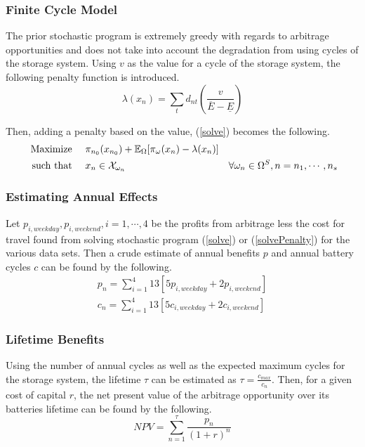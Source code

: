 

\subsubsection{Finite Cycle Model}
The prior stochastic program is extremely greedy with regards to arbitrage opportunities and does not take into account the degradation from using cycles of the storage system.  Using $v$ as the value for a cycle of the storage system, the following penalty function is introduced.
\begin{equation}
	\lambda( x_n ) = \sum_t d_{nt} \left( \frac{v}{  \overline{E} - \underline{E} }\right)
\end{equation} 

Then, adding a penalty based on the value, (\ref{solve}) becomes the following.
\begin{subequations}
\begin{align}
	\mbox{ Maximize } \hspace{10px} & \pi_{n_0}(x_{n_0}) + \Expect_\Omega [ \pi_\omega(x_n) - \lambda(x_{n}) ]  & 	\\
	\mbox{ such that } \hspace{10px} & x_n \in \cX_{\omega_n}  & \forall \omega_n \in \Omega^S, n={n_1, \cdots, n_s}
\end{align}
\label{solvePenalty}
\end{subequations}



\subsubsection{Estimating Annual Effects}
Let $p_{i,weekday}, p_{i,weekend}, i = 1, \cdots, 4$ be the profits from arbitrage less the cost for travel found from solving stochastic program (\ref{solve}) or (\ref{solvePenalty}) for the various data sets.  Then a crude estimate of annual benefits $p$ and annual battery cycles $c$ can be found by the following.
\begin{align}
	p_n = \sum_{i=1}^4 13 [ 5 p_{i,weekday} + 2 p_{i,weekend} ]  \\
	c_n = \sum_{i=1}^4 13 [ 5 c_{i,weekday} + 2 c_{i,weekend} ]  
\end{align}

\subsubsection{Lifetime Benefits}
Using the number of annual cycles as well as the expected maximum cycles for the storage system, the lifetime $\tau$ can be estimated as $\tau = \frac{c_{max}}{c_n}$.  Then, for a given cost of capital $r$, the net present value of the arbitrage opportunity over its batteries lifetime can be found by the following.
\begin{equation}
	NPV = \sum_{n=1}^\tau \frac{p_n}{(1+r)^n}
\end{equation}

